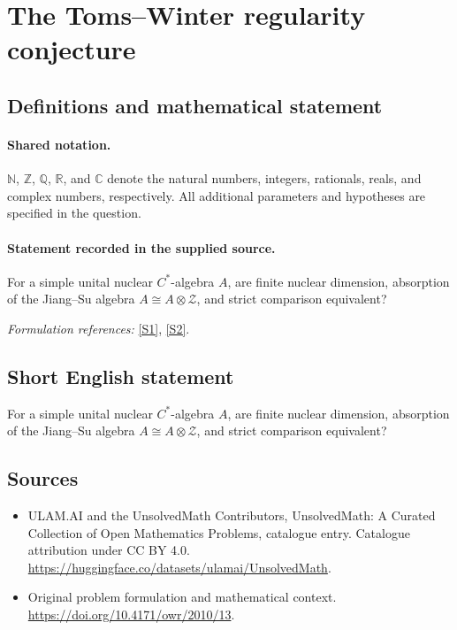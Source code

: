 \documentclass[11pt]{article}
\newcommand{\sref}[2]{\hyperlink{source:#1:#2}{[S#2]}}
\begin{document}
\section{The Toms–Winter regularity conjecture}\label{statement}

\subsection{Definitions and mathematical statement}

\paragraph{Shared notation.}$\mathbb N$, $\mathbb Z$, $\mathbb Q$, $\mathbb R$, and $\mathbb C$ denote the natural numbers, integers, rationals, reals, and complex numbers, respectively. All additional parameters and hypotheses are specified in the question.


\paragraph{Statement recorded in the supplied source.}
For a simple unital nuclear $C^*$-algebra $A$, are finite nuclear dimension, absorption of the Jiang--Su algebra $A\cong A\otimes\mathcal Z$, and strict comparison equivalent?
\par\smallskip\textit{Formulation references:} \sref{statement}{1}, \sref{statement}{2}.
\subsection{Short English statement}
For a simple unital nuclear $C^*$-algebra $A$, are finite nuclear dimension, absorption of the Jiang--Su algebra $A\cong A\otimes\mathcal Z$, and strict comparison equivalent?
\subsection{Sources}
\begin{itemize}
\item[\hypertarget{source:statement:1}{S1}] ULAM.AI and the UnsolvedMath Contributors, UnsolvedMath: A Curated Collection of Open Mathematics Problems, catalogue entry. Catalogue attribution under CC BY 4.0.
\url{https://huggingface.co/datasets/ulamai/UnsolvedMath}.
\item[\hypertarget{source:statement:2}{S2}] Original problem formulation and mathematical context.
\url{https://doi.org/10.4171/owr/2010/13}.
\end{itemize}
\label{end:statement}
\end{document}
